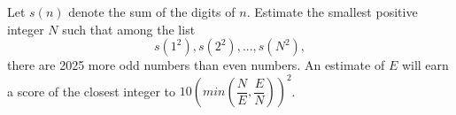 Let $s(n)$ denote the sum of the digits of $n$. Estimate the smallest positive integer $N$ such that among the list \[s(1^2), s(2^2), ..., s(N^2),\]there are 2025 more odd numbers than even numbers. An estimate of $E$ will earn a score of the closest integer to $10 ( min ( \dfrac{N}{E}, \dfrac{E}{N}))^2$.
